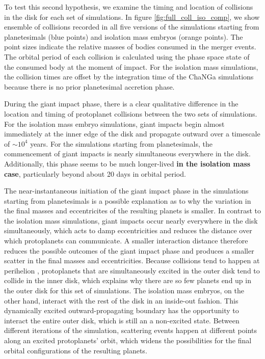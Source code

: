 To test this second hypothesis, we examine the timing and location of collisions in the disk for each set of simulations. In figure \ref{fig:full_coll_iso_comp}, we show ensemble of collisions recorded in all five versions of the simulations starting from planetesimals (blue points) and isolation mass embryos (orange points). The point sizes indicate the relative masses of bodies consumed in the merger events. The orbital period of each collision is calculated using the phase space state of the consumed body at the moment of impact. For the isolation mass simulations, the collision times are offset by the integration time of the {\sc ChaNGa} simulations because there is no prior planetesimal accretion phase.

During the giant impact phase, there is a clear qualitative difference in the location and timing of protoplanet collisions between the two sets of simulations. For the isolation mass embryo simulations, giant impacts begin almost immediately at the inner edge of the disk and propagate outward over a timescale of $\sim 10^{4}$ years. For the simulations starting from planetesimals, the commencement of giant impacts is nearly simultaneous everywhere in the disk. Additionally, this phase seems to be much longer-lived \textbf{in the isolation mass case}, particularly beyond about 20 days in orbital period.

The near-instantaneous initiation of the giant impact phase in the simulations starting from planetesimals is a possible explanation as to why the variation in the final masses and eccentricites of the resulting planets is smaller. In contrast to the isolation mass simulations, giant impacts occur nearly everywhere in the disk simultaneously, which acts to damp eccentricities and reduces the distance over which protoplanets can communicate. A smaller interaction distance therefore reduces the possible outcomes of the giant impact phase and produces a smaller scatter in the final masses and eccentricities. Because collisions tend to happen at perihelion \cite{levison03}, protoplanets that are simultaneously excited in the outer disk tend to collide in the inner disk, which explains why there are so few planets end up in the outer disk for this set of simulations. The isolation mass embryos, on the other hand, interact with the rest of the disk in an inside-out fashion. This dynamically excited outward-propagating boundary has the opportunity to interact the entire outer disk, which is still an a non-excited state. Between different iterations of the simulation, scattering events happen at different points along an excited protoplanets' orbit, which widens the possibilities for the final orbital configurations of the resulting planets.

